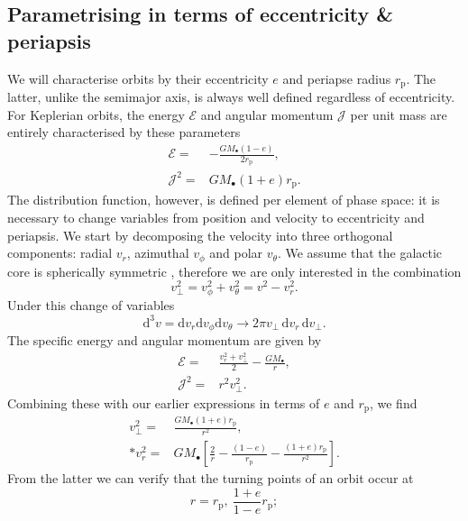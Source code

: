 \documentclass[useAMS,usedcolumn,usegraphicx,usenatbib]{mn2e}
\newcommand{\sub}[1]{\ensuremath{_\mathrm{#1}}}
\newcommand{\dd}{\ensuremath{\mathrm{d}}}
\begin{document}
\subsection{Parametrising in terms of eccentricity \& periapsis}

We will characterise orbits by their eccentricity $e$ and periapse radius $r\sub{p}$. The latter, unlike the semimajor axis, is always well defined regardless of eccentricity. For Keplerian orbits, the energy $\mathcal{E}$ and angular momentum $\mathcal{J}$ per unit mass are entirely characterised by these parameters
\begin{align}
\label{eq:Energy_ecc}
\mathcal{E} = {} & -\frac{GM_\bullet(1 - e)}{2r\sub{p}},\\
\mathcal{J}^2 = {} & GM_\bullet(1 + e)r\sub{p}.
\end{align}
The distribution function, however, is defined per element of phase space: it is necessary to change variables from position and velocity to eccentricity and periapsis. We start by decomposing the velocity into three orthogonal components: radial $v_r$, azimuthal $v_\phi$ and polar $v_\theta$. We assume that the galactic core is spherically symmetric \citep{Genzel2003, Schodel2007}, therefore we are only interested in the combination
\begin{equation}
v_\perp^2 = v_\phi^2 + v_\theta^2 = v^2 - v_r^2.
\end{equation}
Under this change of variables
\begin{equation}
\dd^3v = \dd v_r \dd v_\phi \dd v_\theta \rightarrow 2\pi v_\perp \,\dd v_r \,\dd v_\perp.
\end{equation}
The specific energy and angular momentum are given by
\begin{align}
\mathcal{E} = {} & \frac{v_r^2 + v_\perp^2}{2} - \frac{GM_\bullet}{r},\\
\mathcal{J}^2 = {} & r^2 v_\perp^2.
\end{align}
Combining these with our earlier expressions in terms of $e$ and $r\sub{p}$, we find
\begin{align}
v_\perp^2 = {} & \frac{GM_\bullet(1 + e)r\sub{p}}{r^2}, \nonumber \\*
v_r^2 = {} & GM_\bullet\left[\frac{2}{r} - \frac{(1 - e)}{r\sub{p}} - \frac{(1 + e)r\sub{p}}{r^2}\right].
\end{align}
From the latter we can verify that the turning points of an orbit occur at
\begin{equation}
r = r\sub{p}, \: \frac{1+e}{1-e}r\sub{p};
\end{equation}
\end{document}
